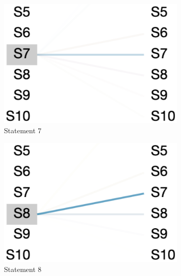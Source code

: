 \begin{figure}
     \centering
     \begin{subfigure}[b]{0.15\textwidth}
         \centering
         \includegraphics[width=\textwidth]{sec9-fig1.png}
         \caption{Statement 7}
         \label{fig:stmt-7}
     \end{subfigure}
     \hfill
     \begin{subfigure}[b]{0.15\textwidth}
         \centering
         \includegraphics[width=\textwidth]{sec9-fig2.png}
         \caption{Statement 8}
         \label{fig:stmt-8}
     \end{subfigure}
     \hfill
     \begin{subfigure}[b]{0.15\textwidth}
         \centering

\end{subfigure}
\end{figure}
